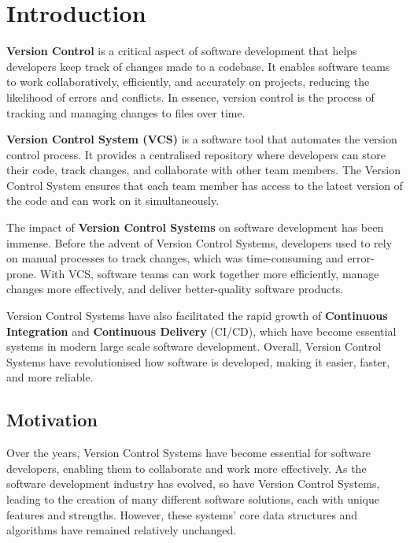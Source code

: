 \chapter{Introduction}
\label{chap:intro}
\textbf{Version Control} is a critical aspect of software development that helps developers keep track of changes made to a codebase. It enables software teams to work collaboratively, efficiently, and accurately on projects, reducing the likelihood of errors and conflicts. In essence, version control is the process of tracking and managing changes to files over time.
\vspace{9pt}

\textbf{Version Control System (VCS)} is a software tool that automates the version control process. It provides a centralised repository where developers can store their code, track changes, and collaborate with other team members. The Version Control System ensures that each team member has access to the latest version of the code and can work on it simultaneously.
\vspace{9pt}

The impact of \textbf{Version Control Systems} on software development has been immense. Before the advent of Version Control Systems, developers used to rely on manual processes to track changes, which was time-consuming and error-prone. With VCS, software teams can work together more efficiently, manage changes more effectively, and deliver better-quality software products.
\vspace{9pt}

Version Control Systems have also facilitated the rapid growth of \textbf{Continuous Integration} and \textbf{Continuous Delivery} (CI/CD), which have become essential systems in modern large scale software development. Overall, Version Control Systems have revolutionised how software is developed, making it easier, faster, and more reliable.

\section{Motivation}
\noindent
Over the years, Version Control Systems have become essential for software developers, enabling them to collaborate and work more effectively. As the software development industry has evolved, so have Version Control Systems, leading to the creation of many different software solutions, each with unique features and strengths. However, these systems' core data structures and algorithms have remained relatively unchanged.
\vspace{9pt}

